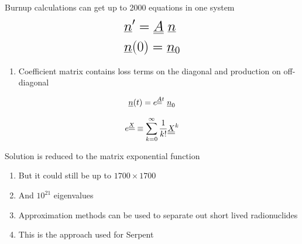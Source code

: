 \documentclass[aspectratio=1610,pdftex,dvipsnames,compress,xcolor={dvipsnames}]{beamer}
\begin{document}
\begin{frame}{Burnup calculations can get up to 2000 equations in one system}
    \begin{equation}
        \LARGE
        \begin{aligned}
            & \underline{n}' = \underline{\underline{A}} \; \underline{n}
            \\
            & \underline{n}(0)=\underline{n}_0
        \end{aligned}
    \end{equation}

    \vspace*{\fill}

    \begin{enumerate}[series=outerlist,topsep=0pt,itemsep=7pt,leftmargin=*,label=(\arabic*)]
        \item[]Coefficient matrix contains loss terms on the diagonal and production on off-diagonal
    \end{enumerate}

    \vspace*{\fill}

    \begin{equation}
        \LARGE
        \underline{n}(t) = e^{\underline{\underline{A}}t} \; \underline{n}_0
    \end{equation}

    \begin{equation}
        \LARGE
        e^{\underline{\underline{X}}} \equiv \sum_{k=0}^{\infty}\frac{1}{k!} {\underline{\underline{X}}}^k
    \end{equation}
\end{frame}


\begin{frame}{Solution is reduced to the matrix exponential function}
    \begin{enumerate}[series=outerlist,topsep=0pt,itemsep=21pt,leftmargin=*,label=(\arabic*)]
        \item[]But it could still be up to $1700 \times 1700$
        \item[]And $10^{21}$ eigenvalues
        \item[]Approximation methods can be used to separate out short lived radionuclides
        \item[]This is the approach used for Serpent
    \end{enumerate}
\end{frame}
\end{document}
